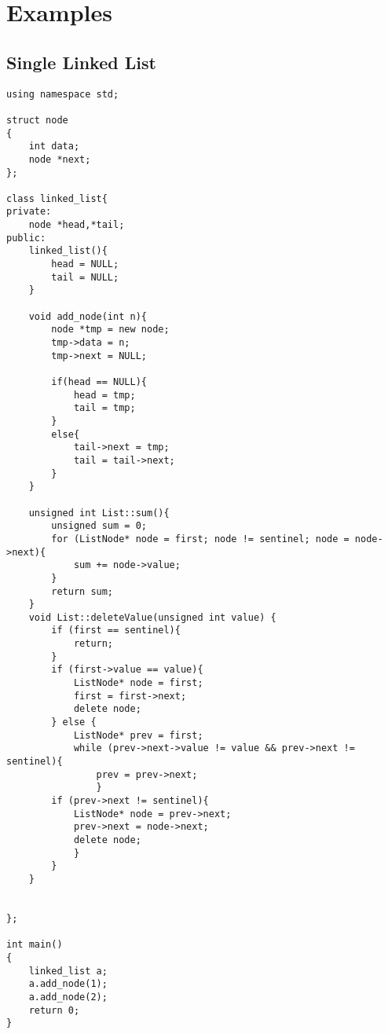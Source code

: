 \section{Examples}

\subsection{Single Linked List}
\begin{lstlisting}[mathescape]
using namespace std;

struct node
{
	int data;
	node *next;
};

class linked_list{
private:
	node *head,*tail;
public:
	linked_list(){
		head = NULL;
		tail = NULL;
	}

	void add_node(int n){
		node *tmp = new node;
		tmp->data = n;
		tmp->next = NULL;

		if(head == NULL){
			head = tmp;
			tail = tmp;
		}
		else{
			tail->next = tmp;
			tail = tail->next;
		}
	}
	
	unsigned int List::sum(){
		unsigned sum = 0;
		for (ListNode* node = first; node != sentinel; node = node->next){
			sum += node->value;
		}
		return sum;
	}
	void List::deleteValue(unsigned int value) {
		if (first == sentinel){
			return;
		}
		if (first->value == value){
			ListNode* node = first;
			first = first->next;
			delete node;
		} else {
			ListNode* prev = first;
			while (prev->next->value != value && prev->next != sentinel){
				prev = prev->next;
				}
		if (prev->next != sentinel){
			ListNode* node = prev->next;
			prev->next = node->next;
			delete node;
			}
		}
	}
	
	
};

int main()
{
	linked_list a;
	a.add_node(1);
	a.add_node(2);
	return 0;
}
\end{lstlisting}



